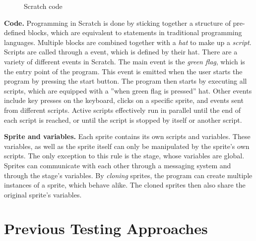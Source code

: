 \begin{figure}[ht]
    \centering
    \caption{Scratch code}
    \label{fig:scratch_code}
\end{figure}

\textbf{Code.}
Programming in Scratch is done by sticking together a structure of pre-defined blocks, which are equivalent to statements in traditional programming languages.
Multiple blocks are combined together with a \textit{hat} to make up a \textit{script}.
Scripts are called through a event, which is defined by their hat. %
There are a variety of different events in Scratch.
The main event is the \textit{green flag}, which is the entry point of the program.
This event is emitted when the user starts the program by pressing the start button.
The program then starts by executing all scripts, which are equipped with a ''when green flag is pressed'' hat.
Other events include key presses on the keyboard, clicks on a specific sprite, and events sent from different scripts.
Active scripts effectively run in parallel until the end of each script is reached, or until the script is stopped by itself or another script.
\parspace

\textbf{Sprite and variables.}
Each sprite contains its own scripts and variables.
These variables, as well as the sprite itself can only be manipulated by the sprite's own scripts.
The only exception to this rule is the stage, whose variables are global.
Sprites can communicate with each other through a messaging system and through the stage's variables.
By \textit{cloning} sprites, the program can create multiple instances of a sprite, which behave alike.
The cloned sprites then also share the original sprite's variables.

\section{Previous Testing Approaches}%
\label{sec:previous_testing_approaches}

